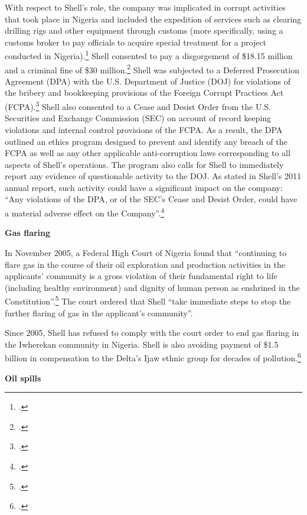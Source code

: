 \documentclass[10pt]{article}
\begin{document}
With respect to Shell's role, the company was implicated in corrupt activities that took place in Nigeria and included the expedition of services such as clearing drilling rigs and other equipment through customs (more specifically, using a customs broker to pay officials to acquire special treatment for a project conducted in Nigeria).\footcite[][]{ShellBribes_2010}
Shell consented to pay a disgorgement of \$18.15 million and a criminal fine of \$30 million.\footcite[][]{SullivanCromwell_2010}
Shell was subjected to a Deferred Prosecution Agreement (DPA) with the U.S. Department of Justice (DOJ) for violations of the bribery and bookkeeping provisions of the Foreign Corrupt Practices Act (FCPA).\footcite[][p.17]{Shell_2011}
Shell also consented to a Cease and Desist Order from the U.S. Securities and Exchange Commission (SEC) on account of record keeping violations and internal control provisions of the FCPA. 
As a result, the DPA outlined an ethics program designed to prevent and identify any breach of the FCPA as well as any other applicable anti-corruption laws corresponding to all aspects of Shell’s operations. 
The program also calls for Shell to immediately report any evidence of questionable activity to the DOJ. 
As stated in Shell's 2011 annual report, such activity could have a significant impact on the company: ``Any violations of the DPA, or of the SEC's Cease and Desist Order, could have a material adverse effect on the Company''.\footcite[][]{Shell_2011}



\textbf{Gas flaring}



In November 2005, a Federal High Court of Nigeria found that ``continuing to flare gas in the course of their oil exploration and production activities in the applicants' community is a gross violation of their fundamental right to life (including healthy environment) and dignity of human person as enshrined in the Constitution''.\footcite[][]{Gbemre2005}
The court ordered that Shell ``take immediate steps to stop the further flaring of gas in the applicant's community''.



Since 2005, Shell has refused to comply with the court order to end gas flaring in the Iwherekan community in Nigeria. 
Shell is also avoiding payment of \$1.5 billion in compensation to the Delta's Ijaw ethnic group for decades of pollution.\footcite[][]{Ukala_2011}



\textbf{Oil spills}
\end{document}
